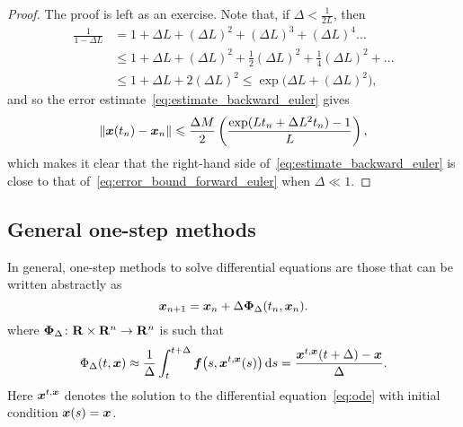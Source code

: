 \begin{proof}
    The proof is left as an exercise.
    Note that, if $\Delta < \frac{1}{2L}$,
    then
    \begin{align*}
         \frac{1}{1 - \Delta L}
         &= 1 + \Delta L + (\Delta L)^2 + (\Delta L)^3 + (\Delta L)^4 \dotsc \\
         &\leq 1 + \Delta L + (\Delta L)^2 + \frac{1}{2} (\Delta L)^2 + \frac{1}{4} (\Delta L)^2 + \dotsc \\
         &\leq 1 + \Delta L + 2 (\Delta L)^2 \leq \exp\bigl(\Delta L + (\Delta L)^2\bigr),
     \end{align*}
     and so the error estimate~\eqref{eq:estimate_backward_euler} gives
     \[
        \lVert\mathbf{\boldsymbol{x}}(t_n) - \mathbf{\boldsymbol{x}}_n\rVert
        \leqslant
        \frac{\Delta M}{2} \left( \frac{\exp(L t_n + \Delta L^2 t_n) - 1}{L} \right),
     \]
     which makes it clear that the right-hand side of~\eqref{eq:estimate_backward_euler} is close to that of~\eqref{eq:error_bound_forward_euler} when $\Delta \ll 1$.
\end{proof}

\subsection{General one-step methods}
\label{sub:one_step_general}
In general, one-step methods to solve differential equations are those that can be written abstractly as
\[
    \mathbf{\boldsymbol{x}}_{n+1} = \mathbf{\boldsymbol{x}}_n + \Delta \mathbf{\boldsymbol{\Phi}}_{\Delta}(t_n, \mathbf{\boldsymbol{x}}_n).
\]
where $\mathbf{\boldsymbol{\Phi}}_{\Delta}\colon \mathbf R \times \mathbf R^n \to \mathbf R^n$ is such that
\[
    \Phi_{\Delta}(t, \mathbf{\boldsymbol{x}})
    \approx \frac{1}{\Delta} \int_{t}^{t+\Delta} \mathbf{\boldsymbol{f}}\bigl(s, \mathbf{\boldsymbol{x}}^{t, \mathbf{\boldsymbol{x}}}(s)\bigr) \, \mathrm d s
    = \frac{\mathbf{\boldsymbol{x}}^{t, \mathbf{\boldsymbol{x}}}(t + \Delta) - \mathbf{\boldsymbol{x}}}{\Delta}.
\]
Here $\mathbf{\boldsymbol{x}}^{t, \mathbf{\boldsymbol{x}}}$ denotes the solution to the differential equation~\eqref{eq:ode} with initial condition $\mathbf{\boldsymbol{x}}(s) = \mathbf{\boldsymbol{x}}$.

